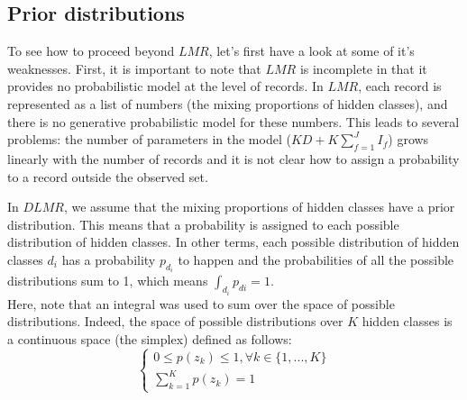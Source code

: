 \subsection{Prior distributions}
\label{3.1}
To see how to proceed beyond $LMR$, let's first have a look at some of it's weaknesses. First, it is important to note that $LMR$ is incomplete in that it provides no probabilistic model at the level of records. In $LMR$, each record is represented as a list of numbers (the mixing proportions of hidden classes), and there is no generative probabilistic model for these numbers. This leads to several problems: the number of parameters in the model ($KD+K\sum_{f=1}^{J}I_{f}$) grows linearly with the number of records and it is not clear how to assign a probability to a record outside the observed set. \par

In $DLMR$, we assume that the mixing proportions of hidden classes have a prior distribution. This means that a probability is assigned to each possible distribution of hidden classes. In other terms, each possible distribution of hidden classes $d_{i}$ has a probability $p_{d_{i}}$ to happen and the probabilities of all the possible distributions sum to 1, which means $\int_{d_{i}}p_{d{i}}=1$.
\\Here, note that an integral was used to sum over the space of possible distributions. Indeed, the space of possible distributions over $K$ hidden classes is a continuous space (the simplex) defined as follows:
\begin{equation}
\left\{\begin{matrix}
0\leqslant p(z_{k})\leqslant 1, \forall k \in \{1,...,K\}
\\ 
\sum_{k=1}^{K}p(z_{k})=1
\end{matrix}\right.
\end{equation}
 \par

